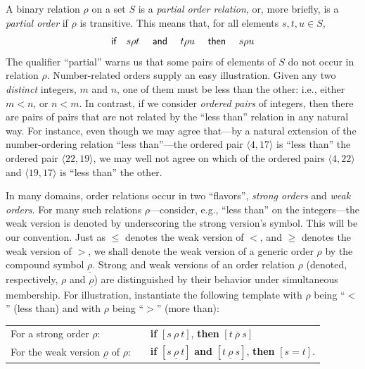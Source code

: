 A binary relation $\rho$ on a set $S$ is a {\it partial order relation}, or, more briefly, is a {\it partial order} if $\rho$ is transitive.  This means that, for all elements $s, t, u \in S$,
\begin{equation}
\label{eq:def-transitive}
\mbox{\sf if } \ \ s \rho t \ \ \ \mbox{\sf \ and } \ \ \ t \rho u \ \ \ \mbox{\sf \ then }
\ \ \ s \rho u
\end{equation}
The qualifier ``partial'' warns us that some pairs of elements of $S$ do not occur in relation $\rho$.  Number-related orders supply an easy illustration.  Given any two {\em distinct} integers, $m$ and $n$, one of them must be less than the other: i.e., either $m < n$, or $n < m$.  In contrast, if we consider {\it ordered pairs} of integers, then there are pairs of pairs that are not related by the ``less than'' relation in any natural way.  For instance, even though we may agree that---by a natural extension of the number-ordering relation ``less than''---the ordered pair $\langle 4, 17 \rangle$ is ``less than'' the ordered pair $\langle 22, 19 \rangle$, we may well not agree on which of the ordered pairs $\langle 4, 22 \rangle$ and $\langle 19, 17 \rangle$ is ``less than'' the other.

\medskip

In many domains, order relations occur in two ``flavors'', {\em strong orders} and {\em weak orders}.  For many such relations $\rho$---consider, e.g., ``less than'' on the integers---the weak version is denoted by underscoring the strong version's symbol.  This will be our convention.  Just as $\leq$ denotes the weak version of $<$, and $\geq$ denotes the weak version of $>$, we shall denote the weak version of a generic order $\rho$ by the compound symbol $\underline{\rho}$.  Strong and weak versions of an order relation $\rho$ (denoted, respectively, $\rho$ and $\underline{\rho}$) are distinguished by their behavior under simultaneous membership.  For illustration, instantiate the following template with $\rho$ being ``$<$'' (less than) and with $\rho$ being ``$>$'' (more than):

\smallskip

\begin{tabular}{lll}
For a strong order $\rho$: & &
{\bf if} $[s \ \rho \ t]$, {\bf then} $[t \ \overline{\rho} \ s]$ \\
For the weak version $\underline{\rho}$ of $\rho$: & &
{\bf if} $[s \ \underline{\rho} \ t]$ {\bf and} $[t \ \underline{\rho}
  \ s]$, {\bf then} $[s = t]$.
\end{tabular}

